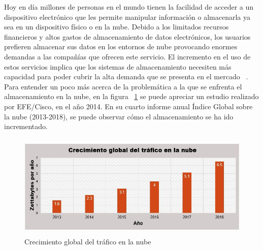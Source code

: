 Hoy en día millones de personas en el mundo tienen la facilidad de acceder a un dispositivo electrónico que les permite manipular información o almacenarla ya sea en un dispositivo físico o en la nube.
Debido a los limitados recursos financieros y altos gastos de almacenamiento de datos electrónicos, los usuarios prefieren almacenar sus datos en los entornos de nube provocando enormes demandas a las compañías que ofrecen este servicio. El incremento en el uso de estos servicios implica que los sistemas de almacenamiento necesiten más capacidad para poder cubrir la alta demanda que se presenta en el mercado ~\cite{Keelveedhi}. \\


Para entender un poco más acerca de la problemática a la que se enfrenta el almacenamiento en la nube, en la figura ~\ref{fig:1-1-1} se puede apreciar un estudio realizado por EFE/Cisco, en el año 2014. En su cuarto informe anual Índice Global sobre la nube (2013-2018), se puede observar c\'omo el almacenamiento se ha ido incrementado. \\

\begin{figure}[H]
\centering
\includegraphics[width=13cm, height=5cm]{./images/crecimientoNube.jpg}
\caption{Crecimiento global del tráfico en la nube}
\label{fig:1-1-1}
\end{figure}

